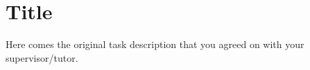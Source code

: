 \chapter{\label{originalproblem}Title}
Here comes the original task description that you agreed on with your supervisor/tutor.